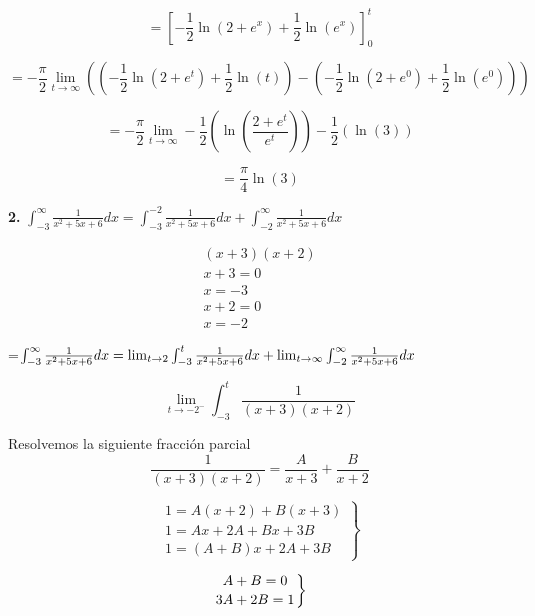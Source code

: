 \documentclass[12pt]{article}
\begin{document}
\begin{flushleft}
$$=\left[-\frac{1}{2}\ln{\left(2+e^{x}\right)}+\frac{1}{2}\ln{\left(e^{x}\right)}\right]_{0}^{t}$$



$$=-\frac{\pi}{2}\lim_{t \to \infty }\left ( \left ( -\frac{1}{2}\ln \left ( 2+e^{t}\right) +\frac{1}{2}\ln \left ( t \right )\right ) -\left ( -\frac{1}{2}\ln \left ( 2+e^{0} \right )+\frac{1}{2} \ln \left ( e^{0}\right )\right ) \right )$$



$$=-\frac{\pi}{2}\lim_{t \to \infty} -\frac{1}{2}\left(\ln\left(\frac{2+e^{t}}{e^{t}}\right)\right)-\frac{1}{2}\left(\ln\left(3\right)\right)$$


$$=\frac{\pi}{4} \ln(3)$$ 





\newpage


\textbf{2.} $\int_{-3}^{\infty } \frac{1}{x^2+5x+6} dx = \int_{-3}^{-2} \frac{1}{x^2+5x+6} dx + \int_{-2}^{\infty}\frac{1}{x^2+5x+6}dx$

\vspace{0.3cm}
\begin{align*}
    (x+3)(x+2)\\
      x+3=0\\
      x=-3\\
      x+2=0\\
      x=-2
\end{align*}

\vspace{0.5cm}
=$\int_{-3}^{\infty} \frac{1}{x^2+5x+6}dx = \lim_{t \to \-2} \int_{-3}^{t}\frac{1}{x^2+5x+6}dx + \lim_{t \to \infty} \int_{-2}^{\infty}\frac{1}{x^2+5x+6}dx$


$$\lim_{t \to -2^-} \int_{-3}^{t} \frac{1}{(x+3)(x+2)}$$
\vspace{0.5cm}


Resolvemos la siguiente fracción parcial\\


$$\frac{1}{(x+3)(x+2)}= \frac{A}{x+3}+\frac{B}{x+2}$$


   $$\left.\begin{matrix}
1 = A(x+2) + B(x+3)\\ 
1=Ax+2A+Bx+3B \\ 
1=(A+B)x + 2A+3B
\end{matrix}\right\}$$

$$\left.
A+B = 0 \atop
3A + 2B= 1
\right\}$$
\vspace{0.5cm}


\end{flushleft}
\end{document}
